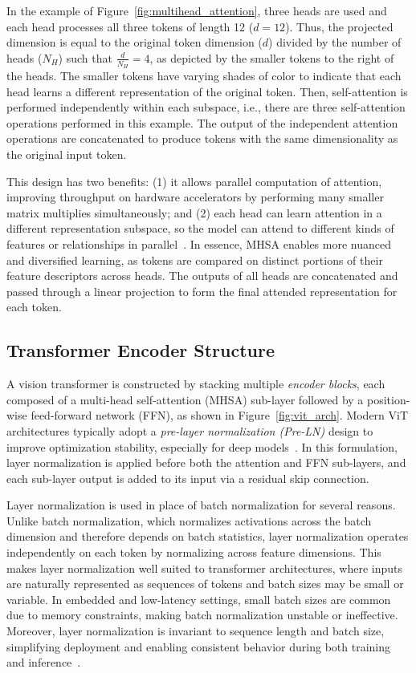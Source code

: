 \documentclass[runningheads,a4paper]{llncs}
\begin{document}
In the example of Figure~\ref{fig:multihead_attention}, three heads are used and each head processes all three tokens of length 12 ($d=12$). Thus, the projected dimension is equal to the original token dimension ($d$) divided by the number of heads ($N_H$) such that $\frac{d}{N_H}=4$, as depicted by the smaller tokens to the right of the heads. The smaller tokens have varying shades of color to indicate that each head learns a different representation of the original token. Then, self-attention is performed independently within each subspace, i.e., there are three self-attention operations performed in this example. The output of the independent attention operations are concatenated to produce tokens with the same dimensionality as the original input token.

This design has two benefits: (1) it allows parallel computation of attention, improving throughput on hardware accelerators by performing many smaller matrix multiplies simultaneously; and (2) each head can learn attention in a different representation subspace, so the model can attend to different kinds of features or relationships in parallel~\cite{vaswani2017attention,zhang2021d2l}. In essence, MHSA enables more nuanced and diversified learning, as tokens are compared on distinct portions of their feature descriptors across heads. The outputs of all heads are concatenated and passed through a linear projection to form the final attended representation for each token.

\subsection{Transformer Encoder Structure}
A vision transformer is constructed by stacking multiple \emph{encoder blocks}, each composed of a multi-head self-attention (MHSA) sub-layer followed by a position-wise feed-forward network (FFN), as shown in Figure~\ref{fig:vit_arch}. Modern ViT architectures typically adopt a \emph{pre-layer normalization (Pre-LN)} design to improve optimization stability, especially for deep models~\cite{xiong2020preln}. In this formulation, layer normalization is applied before both the attention and FFN sub-layers, and each sub-layer output is added to its input via a residual skip connection.

Layer normalization is used in place of batch normalization for several reasons. Unlike batch normalization, which normalizes activations across the batch dimension and therefore depends on batch statistics, layer normalization operates independently on each token by normalizing across feature dimensions. This makes layer normalization well suited to transformer architectures, where inputs are naturally represented as sequences of tokens and batch sizes may be small or variable. In embedded and low-latency settings, small batch sizes are common due to memory constraints, making batch normalization unstable or ineffective. Moreover, layer normalization is invariant to sequence length and batch size, simplifying deployment and enabling consistent behavior during both training and inference~\cite{ba2016layernorm}.
\end{document}
